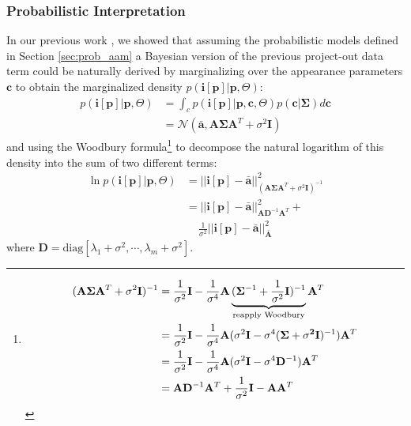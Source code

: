 \subsubsection*{Probabilistic Interpretation}
\label{sec:po_pi}
In our previous work \cite{Alabort2014}, we showed that assuming the probabilistic models defined in Section \ref{sec:prob_aam} a Bayesian version of the previous project-out data term could be naturally derived by marginalizing over the appearance parameters $\mathbf{c}$ to obtain the marginalized density $p(\mathbf{i}[\mathbf{p}] | \mathbf{p}, \Theta)$:
\begin{equation}
    \begin{aligned}
        p(\mathbf{i}[\mathbf{p}] | \mathbf{p}, \Theta) & = \int_c p(\mathbf{i}[\mathbf{p}] | \mathbf{p}, \mathbf{c}, \Theta) p(\mathbf{c}|\mathbf{\Sigma}) d\mathbf{c} 
        \\
        & = \mathcal{N}(\bar{\mathbf{a}}, \mathbf{A}\mathbf{\Sigma}\mathbf{A}^T + \sigma^2 \mathbf{I})
    \end{aligned}
    \label{eq:marginal}
\end{equation}
and using the Woodbury formula\footnote{
\begin{equation*}
    \begin{aligned}
    \small
    	(\mathbf{A} \mathbf{\Sigma} \mathbf{A}^T + \sigma^2 \mathbf{I})^{-1} & = \frac{1}{\sigma^2} \mathbf{I} - \frac{1}{\sigma^4} \mathbf{A} \underbrace{(\mathbf{\Sigma}^{-1} + \frac{1}{\sigma^2}\mathbf{I})^{-1}}_{\textrm{reapply Woodbury}} \mathbf{A}^T
    	\\
    	& = \frac{1}{\sigma^2} \mathbf{I} - \frac{1}{\sigma^4} \mathbf{A} (\sigma^2\mathbf{I} - \sigma^4(\mathbf{\Sigma + \sigma^2\mathbf{I}})^{-1}) \mathbf{A}^T
    	\\
    	& = \frac{1}{\sigma^2} \mathbf{I} - \frac{1}{\sigma^4} \mathbf{A} (\sigma^2\mathbf{I} - \sigma^4\mathbf{D}^{-1}) \mathbf{A}^T
    	\\
    	& = \mathbf{A}\mathbf{D}^{-1}\mathbf{A}^T + \frac{1}{\sigma^2} \mathbf{I} - \mathbf{A}\mathbf{A}^T
    \end{aligned}
    \label{eq:woodbury}
\end{equation*}} \cite{Woodbury1950} to decompose the natural logarithm of this density into the sum of two different terms:
\begin{equation}
    \begin{aligned}
        \ln p(\mathbf{i}[\mathbf{p}] | \mathbf{p}, \Theta) & = || \mathbf{i}[\mathbf{p}] - \mathbf{\bar{a}} ||^2_{(\mathbf{A}\mathbf{\Sigma}\mathbf{A}^T + \sigma^2 \mathbf{I})^{-1}}
        \\
        & = || \mathbf{i}[\mathbf{p}] - \mathbf{\bar{a}} ||^2_{\mathbf{A}\mathbf{D}^{-1}\mathbf{A}^T} + 
        \\
        & \quad \, \frac{1}{\sigma^2}|| \mathbf{i}[\mathbf{p}] - \mathbf{\bar{a}} ||^2_{\bar{\mathbf{A}}}
    \end{aligned}
    \label{eq:marginal}
\end{equation}
where $\mathbf{D} = \textrm{diag}[\lambda_1 + \sigma^2, \cdots, \lambda_m + \sigma^2]$.

